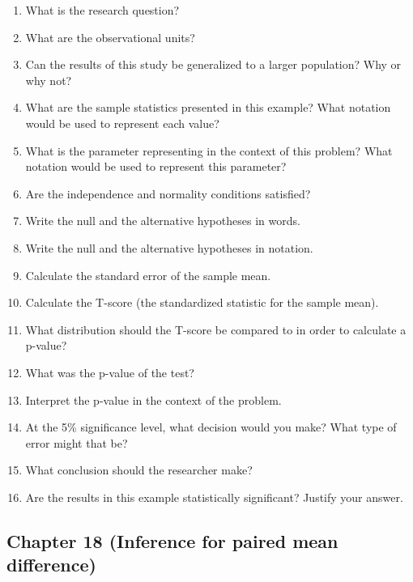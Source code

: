 \documentclass[
]{report}
\newcommand{\rgs}{\vspace{12pt}} %
\begin{document}
\begin{enumerate}
\def\labelenumi{\arabic{enumi}.}
\item
  What is the research question?
  \rgs
\item
  What are the observational units?
  \rgs
\item
  Can the results of this study be generalized to a larger population? Why or why not?
  \rgs
\item
  What are the sample statistics presented in this example? What notation would be used to represent each value?
  \rgs
\item
  What is the parameter representing in the context of this problem? What notation would be used to represent this parameter?
  \rgs
  \rgs
\item
  Are the independence and normality conditions satisfied?
  \rgs
  \rgs
\item
  Write the null and the alternative hypotheses in words.
  \rgs
  \rgs
\item
  Write the null and the alternative hypotheses in notation.
  \rgs
\item
  Calculate the standard error of the sample mean.
  \rgs
  \rgs
\item
  Calculate the T-score (the standardized statistic for the sample mean).
  \rgs
  \rgs
\item
  What distribution should the T-score be compared to in order to calculate a p-value?
  \rgs
\item
  What was the p-value of the test?
  \rgs
\item
  Interpret the p-value in the context of the problem.
  \rgs
  \rgs
\item
  At the 5\% significance level, what decision would you make? What type of error might that be?
  \rgs
\item
  What conclusion should the researcher make?
  \rgs
  \rgs
\item
  Are the results in this example statistically significant? Justify your answer.
  \rgs
\end{enumerate}

\hypertarget{chapter-18-inference-for-paired-mean-difference}{%
\subsection*{Chapter 18 (Inference for paired mean difference)}\label{chapter-18-inference-for-paired-mean-difference}}
\end{document}
